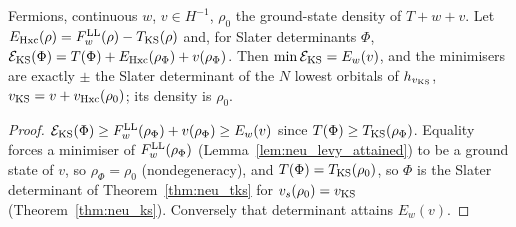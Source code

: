 \begin{theorem}
  \label{thm:neu_aufbau}
  \leanok
  Fermions, continuous $w$, $v\in H^{-1}$, $\rho_0$ the ground-state density of $T+w+v$. Let
  $E_{\rm Hxc}(\rho)=F^{\rm LL}_w(\rho)-T_{\rm KS}(\rho)$ and, for Slater determinants $\Phi$,
  $\mathcal E_{\rm KS}(\Phi)=T(\Phi)+E_{\rm Hxc}(\rho_\Phi)+v(\rho_\Phi)$. Then $\min\mathcal E_{\rm KS}=E_w(v)$, and the minimisers
  are exactly $\pm$ the Slater determinant of the $N$ lowest orbitals of $h_{v_{\rm KS}}$, $v_{\rm KS}=v+v_{\rm Hxc}(\rho_0)$;
  its density is $\rho_0$.
\end{theorem}
\begin{proof}
  \leanok
  $\mathcal E_{\rm KS}(\Phi)\ge F^{\rm LL}_w(\rho_\Phi)+v(\rho_\Phi)\ge E_w(v)$ since $T(\Phi)\ge T_{\rm KS}(\rho_\Phi)$. Equality
  forces a minimiser of $F^{\rm LL}_w(\rho_\Phi)$ (Lemma~\ref{lem:neu_levy_attained}) to be a ground state of $v$, so
  $\rho_\Phi=\rho_0$ (nondegeneracy), and $T(\Phi)=T_{\rm KS}(\rho_0)$, so $\Phi$ is the Slater determinant of
  Theorem~\ref{thm:neu_tks} for $v_s(\rho_0)=v_{\rm KS}$ (Theorem~\ref{thm:neu_ks}). Conversely that determinant attains $E_w(v)$.
\end{proof}
